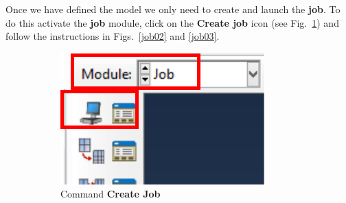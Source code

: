   Once we have defined the model we only need to create and launch the
  \textbf{job}. To do this activate the \textbf{job} module,
  click on the \textbf {Create job} icon (see Fig.~\ref{job01}) and
  follow the instructions in Figs.~\ref{job02} and \ref{job03}.
  \begin{figure}[!h]
    \centering
    \begin{subfigure}[!h]{0.21\textwidth}
      \includegraphics[width=\textwidth]{./body/images/job01.pdf}
      \caption{Command \textbf{Create Job}}
      \label{job01}
    \end{subfigure}%
    ~ %
    \begin{subfigure}[!h]{0.32\textwidth}

\end{subfigure}
\end{figure}
